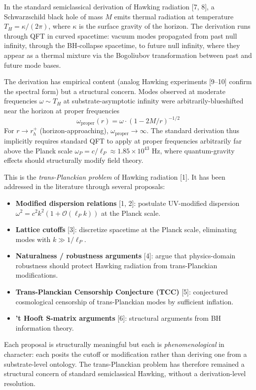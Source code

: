 \documentclass[11pt,a4paper]{article}
\begin{document}
In the standard semiclassical derivation of Hawking radiation [7, 8], a Schwarzschild black hole of mass $M$ emits thermal radiation at temperature $T_H = \kappa/(2\pi)$, where $\kappa$ is the surface gravity of the horizon. The derivation runs through QFT in curved spacetime: vacuum modes propagated from past null infinity, through the BH-collapse spacetime, to future null infinity, where they appear as a thermal mixture via the Bogoliubov transformation between past and future mode bases.

The derivation has empirical content (analog Hawking experiments [9--10] confirm the spectral form) but a structural concern. Modes observed at moderate frequencies $\omega \sim T_H$ at substrate-asymptotic infinity were arbitrarily-blueshifted near the horizon at proper frequencies
\[
\omega_\mathrm{proper}(r) = \omega \cdot (1 - 2M/r)^{-1/2}
\]
For $r \to r_h^+$ (horizon-approaching), $\omega_\mathrm{proper} \to \infty$. The standard derivation thus implicitly requires standard QFT to apply at proper frequencies arbitrarily far above the Planck scale $\omega_P = c/\ell_P \approx 1.85 \times 10^{43}$ Hz, where quantum-gravity effects should structurally modify field theory.

This is the \emph{trans-Planckian problem} of Hawking radiation [1]. It has been addressed in the literature through several proposals:

\begin{itemize}[noitemsep]
\item \textbf{Modified dispersion relations} [1, 2]: postulate UV-modified dispersion $\omega^{2} = c^{2} k^{2} (1 + \mathcal{O}(\ell_P k))$ at the Planck scale.
\item \textbf{Lattice cutoffs} [3]: discretize spacetime at the Planck scale, eliminating modes with $k \gg 1/\ell_P$.
\item \textbf{Naturalness / robustness arguments} [4]: argue that physics-domain robustness should protect Hawking radiation from trans-Planckian modifications.
\item \textbf{Trans-Planckian Censorship Conjecture (TCC)} [5]: conjectured cosmological censorship of trans-Planckian modes by sufficient inflation.
\item \textbf{'t Hooft S-matrix arguments} [6]: structural arguments from BH information theory.
\end{itemize}

Each proposal is structurally meaningful but each is \emph{phenomenological} in character: each posits the cutoff or modification rather than deriving one from a substrate-level ontology. The trans-Planckian problem has therefore remained a structural concern of standard semiclassical Hawking, without a derivation-level resolution.
\end{document}
